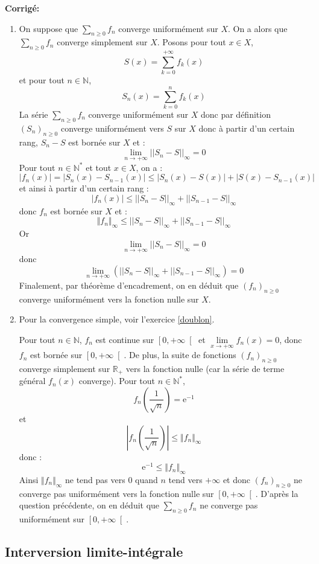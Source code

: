 \documentclass[a4paper,twoside,french,11pt]{VcCours}
\newcommand{\Sum}[2]{\sum_{#1}^{#2}}
\newcommand{\corr}{\textbf{Corrigé:}}
\begin{document}
\corr 
\begin{enumerate}
\item On suppose que $\Sum{n\geq 0}{} f_n$ converge uniformément sur $X$. On a alors que $\Sum{n\geq 0}{} f_n$ converge simplement sur $X$. Posons pour tout $x \in X$,
$$S(x)=\sum\limits_{k=0}^{+\infty}f_k(x)$$
et pour tout $n\in\mathbb{N}$, 
$$S_n(x)=\sum\limits_{k=0}^{n}f_k(x)$$
La série $\Sum{n\geq 0}{} f_n$ converge uniformément sur $X$ donc par définition $(S_n)_{n \geq 0}$ converge uniformément vers $S$ sur $X$ donc à partir d'un certain rang, $S_n-S$ est bornée sur $X$ et :
$$\lim\limits_{n\to+\infty}^{}||S_n-S||_{\infty}=0$$ 
Pour tout $n \in \mathbb{N}^*$ et tout $x \in X$, on a :
$$|f_n(x)|=|S_n(x)-S_{n-1}(x)|\leq |S_n(x)-S(x)|+|S(x)-S_{n-1}(x)|$$
et ainsi à partir d'un certain rang :
$$|f_n(x)|\leq ||S_n-S||_{\infty} +||S_{n-1}-S||_{\infty} $$ 
donc $f_n$ est bornée sur $X$ et : 
$$ \Vert f_n \Vert_{\infty} \leq ||S_n-S||_{\infty} +||S_{n-1}-S||_{\infty} $$ 
Or  
$$\lim\limits_{n\to+\infty}^{}||S_n-S||_{\infty}=0$$ 
donc   
$$\lim\limits_{n\to+\infty}^{}\left( ||S_n-S||_{\infty}+||S_{n-1}-S||_{\infty}\right) =0$$
Finalement, par théorème d'encadrement, on en déduit que  $(f_n)_{n \geq 0}$ converge uniformément vers la fonction nulle sur $X$.
\item Pour la convergence simple, voir l'exercice \ref{doublon}.

\medskip

Pour tout $n\in\mathbb{N}$, $f_n$ est continue sur  $\left[0,+\infty \right[$ et  $\lim\limits_{x\to +\infty}^{}f_n(x)=0$, donc $f_n$ est bornée sur $\left[0,+\infty \right[$. De plus, la suite de fonctions $(f_n)_{n \geq 0}$ converge simplement sur $\mathbb{R}_+$ vers la fonction nulle (car la série de terme général $f_n(x)$ converge). Pour tout $n\in\mathbb{N}^*$, 
$$f_n\left( \dfrac{1}{\sqrt{n}}\right) =\mathrm{e}^{-1}$$
et
$$\left\vert f_n\left( \dfrac{1}{\sqrt{n}}\right) \right\vert \leq \Vert f_n \Vert_{\infty}$$
donc :
$$ \mathrm{e}^{-1} \leq \Vert f_n \Vert_{\infty}$$
Ainsi $\Vert f_n \Vert_{\infty}$ ne tend pas vers $0$ quand $n$ tend vers $+ \infty$ et donc $(f_n)_{n \geq 0}$ ne converge pas uniformément vers la fonction nulle sur $\left[0,+\infty \right[$. D'après la question précédente, on en déduit que $\Sum{n\geq 0}{} f_n$ ne converge pas uniformément sur $\left[0,+\infty \right[$.
\end{enumerate}


\subsection{Interversion limite-intégrale}
\end{document}
